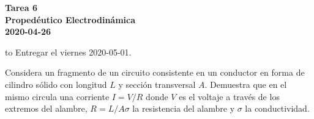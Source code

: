 \documentclass{exam}
\begin{document}
\begin{center}
  \bf\large Tarea 6\\
  Propedéutico Electrodinámica\\
  2020-04-26\\[20pt]
\end{center}
\hbox to \textwidth{Nombre: \enspace\hrulefill}
Entregar el viernes 2020-05-01.

\begin{questions}
  \question Considera un fragmento de un circuito consistente en un
  conductor en forma de cilindro sólido
  con longitud $L$ y sección transversal $A$. Demuestra que en el
  mismo circula una corriente $I=V/R$ donde $V$ es el voltaje a través
  de los extremos del alambre, $R=L/A\sigma$ la
  resistencia del alambre y $\sigma$ la conductividad.


\end{questions}
\end{document}
